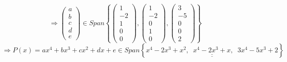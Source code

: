 \documentclass[12pt]{article}
\begin{document}
\begin{enumerate}
\begin{enumerate}
      \[
        \Longrightarrow
        \left(\begin{array}{c}
          a\\b\\c\\d\\e
        \end{array}\right) \in Span \left\{
          \left(\begin{array}{c}
            1\\-2\\1\\0\\0
          \end{array}\right),
          \left(\begin{array}{c}
            1\\-2\\0\\1\\0
          \end{array}\right),
          \left(\begin{array}{c}
            3\\-5\\0\\0\\2
          \end{array}\right)
        \right\}
      \]
      \[
        \Longrightarrow
        P(x) = ax^4+bx^3+cx^2+dx+e \in Span \left\{
          \underline{\underline{x^4-2x^3+x^2,\;\; x^4-2x^3+x,\;\; 3x^4-5x^3+ 2}}
        \right\}
      \]

      
  \end{enumerate}


\end{enumerate}
\end{document}
